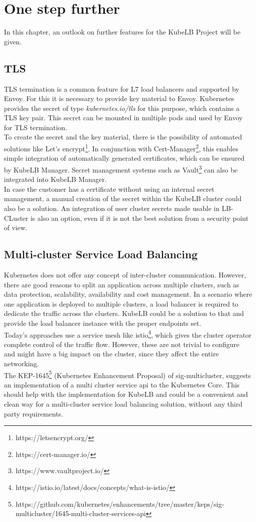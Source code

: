 \chapter{One step further}

In this chapter, an outlook on further features for the KubeLB Project will be given.

\section{TLS}

TLS termination is a common feature for L7 load balancers and supported by Envoy.
For this it is necessary to provide key material to Envoy.
Kubernetes provides the secret of type \textit{kubernetes.io/tls} for this purpose, which contains a TLS key pair.
This secret can be mounted in multiple pods and used by Envoy for TLS termination.
\\
To create the secret and the key material, there is the possibility of automated solutions like Let's encrypt\footnote{https://letsencrypt.org/}.
In conjunction with Cert-Manager\footnote{https://cert-manager.io/}, this enables simple integration of automatically generated certificates, which can be ensured by KubeLB Manager.
Secret management systems such as Vault\footnote{https://www.vaultproject.io/} can also be integrated into KubeLB Manager.
\\
In case the customer has a certificate without using an internal secret management, a manual creation of the secret within the KubeLB cluster could also be a solution.
An integration of user cluster secrets made usable in LB-CLuster is also an option, even if it is not the best solution from a security point of view.

\section{Multi-cluster Service Load Balancing}

Kubernetes does not offer any concept of inter-cluster communication.
However, there are good reasons to split an application across multiple clusters, such as data protection, scalability, availability and cost management.
In a scenario where one application is deployed to multiple clusters, a load balancer is required to dedicate the traffic across the clusters.
KubeLB could be a solution to that and provide the load balancer instance with the proper endpoints set.
\\
Today's approaches use a service mesh like istio\footnote{https://istio.io/latest/docs/concepts/what-is-istio/}, which gives the cluster operator complete control of the traffic flow.
However, these are not trivial to configure and might have a big impact on the cluster, since they affect the entire networking.
\\
The KEP-1645\footnote{https://github.com/kubernetes/enhancements/tree/master/keps/sig-multicluster/1645-multi-cluster-services-api} (Kubernetes Enhancement Proposal) of sig-multicluster, suggests an implementation of a multi cluster service api to the Kubernetes Core.
This should help with the implementation for KubeLB and could be a convenient and clean way for a multi-cluster service load balancing solution, without any third party requirements.
